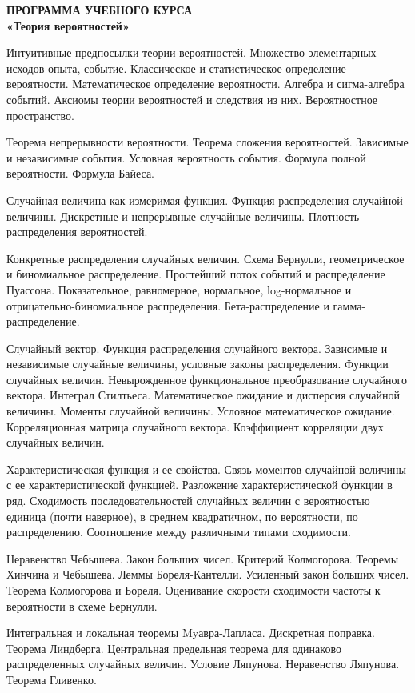 \begin{center}

\textbf{ПРОГРАММА УЧЕБНОГО КУРСА  \\ 
«Теория вероятностей»  \\}
 

\end{center}
 
 
 
Интуитивные предпосылки теории вероятностей. Множество элементарных исходов опыта, событие. Классическое и статистическое определение вероятности. Математическое определение вероятности. Алгебра и сигма-алгебра событий. Аксиомы теории вероятностей и следствия из них. Вероятностное пространство.

Теорема непрерывности вероятности. Теорема сложения вероятностей. Зависимые и независимые события. Условная вероятность события. Формула полной вероятности. Формула Байеса.

Случайная величина как измеримая функция. Функция распределения случайной величины. Дискретные и непрерывные случайные величины. Плотность распределения вероятностей.

Конкретные распределения случайных величин. Схема Бернулли, геометрическое и биномиальное распределение. Простейший поток событий и распределение Пуассона. Показательное, равномерное, нормальное, log-нормальное и отрицательно-биномиальное распределения. Бета-распределение и гамма-распределение.

Случайный вектор. Функция распределения случайного вектора. Зависимые и независимые случайные величины, условные законы распределения. Функции случайных величин. Невырожденное функциональное преобразование случайного вектора.
Интеграл Стилтьеса. Математическое ожидание и дисперсия случайной величины. Моменты случайной величины. Условное математическое ожидание. Корреляционная матрица случайного вектора. Коэффициент корреляции двух случайных величин.

Характеристическая функция и ее свойства. Связь моментов случайной величины с ее характеристической функцией. Разложение характеристической функции в ряд.
Сходимость последовательностей случайных величин с вероятностью единица (почти наверное), в среднем квадратичном, по вероятности, по распределению. Соотношение между различными типами сходимости.

Неравенство Чебышева. Закон больших чисел. Критерий Колмогорова. Теоремы Хинчина и Чебышева. Леммы Бореля-Кантелли. Усиленный закон больших чисел. Теорема Колмогорова и Бореля. Оценивание скорости сходимости частоты к вероятности в схеме Бернулли.

Интегральная и локальная теоремы Myавра-Лапласа. Дискретная поправка. Теорема Линдберга. Центральная предельная теорема для одинаково распределенных случайных величин. Условие Ляпунова. Неравенство Ляпунова. Теорема Гливенко.